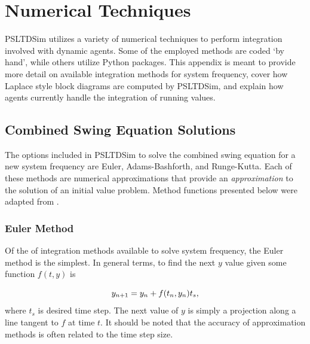 \documentclass[12pt]{report}
\begin{document}
\chapter{Numerical Techniques}\label{appendix: numericalTech}

PSLTDSim utilizes a variety of numerical techniques to perform integration involved with dynamic agents.
Some of the employed methods are coded `by hand', while others utilize Python packages.
This appendix is meant to 
provide more detail on available integration methods for system frequency,
cover how Laplace style block diagrams are computed by PSLTDSim, 
and explain how agents currently handle the integration of running values.



\section{Combined Swing Equation Solutions}
The options included in PSLTDSim to solve the combined swing equation for a new system frequency are Euler, Adams-Bashforth, and Runge-Kutta.
Each of these methods are numerical approximations that provide an \emph{approximation} to the solution of an initial value problem.
Method functions presented below were adapted from \cite{BoyceDiprima}.

\subsection{Euler Method}
Of the of integration methods available to solve system frequency, the Euler method is the simplest.
In general terms, to find the next $y$ value given some function $f(t, y)$ is

\begin{equation}{\label{eq: generic euler} }
y_{n+1} = y_n + f(t_n, y_n)t_s,
\end{equation}%
\noindent where $t_s$ is desired time step.
The next value of $y$ is simply a projection along a line tangent to $f$ at time $t$.
It should be noted that the accuracy of approximation methods is often related to the time step size.
\end{document}
